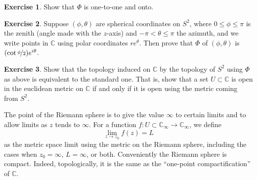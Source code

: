 \documentclass[12pt,openany]{book}
\newcommand{\C}{{\mathbb{C}}}
\theoremstyle{plain}
\theoremstyle{remark}
\theoremstyle{definition}
\newenvironment{exbox}{%
    \def\FrameCommand{\vrule width 1pt \relax\hspace {10pt}}%
    \MakeFramed {\advance \hsize -\width \FrameRestore }%
}{%
    \endMakeFramed
}
\theoremstyle{exercise}
\newtheorem{exercise}{Exercise}[section]
\theoremstyle{example}
\begin{document}
\begin{exbox}
\begin{exercise}
Show that $\Phi$ is one-to-one and onto.
\end{exercise}

\begin{exercise}
Suppose $(\phi,\theta)$
are spherical coordinates on $S^2$, where $0 \leq \phi \leq \pi$ is the zenith (angle made
with the $z$-axis) and $-\pi < \theta \leq \pi$ the azimuth, and we write
points in $\C$ using polar coordinates $re^{\theta}$.  Then prove that $\Phi$ of
$(\phi,\theta)$ is $(\cot \nicefrac{\phi}{2})e^{i\theta}$.
\end{exercise}

\begin{exercise}
Show that the topology induced on $\C$ by the topology of $S^2$ using $\Phi$
as above is equivalent to the standard one.  That is, show that a set $U
\subset \C$
is open in the euclidean metric on $\C$ if and only if it is open using the
metric coming from $S^2$.
\end{exercise}
\end{exbox}

The point of the Riemann sphere is to give the value $\infty$ to certain
limits and to allow limits as $z$ tends to $\infty$.  For a
function $f \colon U \subset \C_\infty \to \C_\infty$, we define
\begin{equation*}
\lim_{z \to z_0} f(z) = L
\end{equation*}
as the metric space limit using the metric on the Riemann sphere, 
including
the cases when $z_0 = \infty$, $L = \infty$, or both.
Conveniently the Riemann sphere is compact.
Indeed, topologically, it is the same as the
``one-point compactification'' of $\C$.
\end{document}
